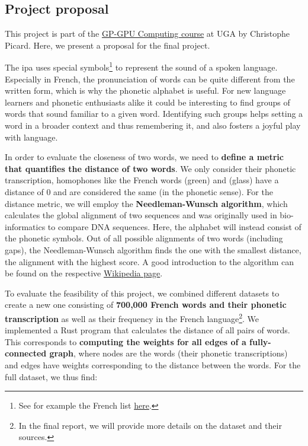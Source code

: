 \begin{multicols*}{2}
    
\section{Project proposal}

This project is part of the \href{https://membres-ljk.imag.fr/Christophe.Picard/teaching/gp-gpu}{GP-GPU Computing course} at UGA by Christophe Picard. Here, we present a proposal for the final project.

The \gls{ipa} uses special symbols\footnote{See for example the French list \href{https://en.wikipedia.org/wiki/Help:IPA/French}{here}.} to represent the sound of a spoken language. Especially in French, the pronunciation of words can be quite different from the written form, which is why the phonetic alphabet is useful. For new language learners and phonetic enthusiasts alike it could be interesting to find groups of words that sound familiar to a given word. Identifying such groups helps setting a word in a broader context and thus remembering it, and also fosters a joyful play with language.

In order to evaluate the closeness of two words, we need to \textbf{define a metric that quantifies the distance of two words}. We only consider their phonetic transcription, \ie homophones like the French words  (green) and  (glass) have a distance of 0 and are considered the same (in the phonetic sense). For the distance metric, we will employ the \textbf{Needleman-Wunsch algorithm}, which calculates the global alignment of two sequences and was originally used in bio-informatics to compare DNA sequences. Here, the alphabet will instead consist of the phonetic symbols. Out of all possible alignments of two words (including gaps), the Needleman-Wunsch algorithm finds the one with the smallest distance, \ie the alignment with the highest score. A good introduction to the algorithm can be found on the respective \href{https://en.wikipedia.org/wiki/Needleman%E2%80%93Wunsch_algorithm}{Wikipedia page}.

To evaluate the feasibility of this project, we combined different datasets to create a new one consisting of \textbf{700,000 French words and their phonetic transcription} as well as their frequency in the French language\footnote{In the final report, we will provide more details on the dataset and their sources.}. We implemented a Rust program that calculates the distance of all pairs of words. This corresponds to \textbf{computing the weights for all edges of a fully-connected graph}, where nodes are the words (their phonetic transcriptions) and edges have weights corresponding to the distance between the words. For the full dataset, we thus find:


\end{multicols*}
